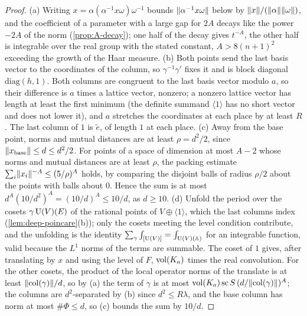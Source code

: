 \begin{proof}
(a) Writing $x=\alpha(\alpha^{-1}x\omega)\omega^{-1}$ bounds $\lVert \alpha^{-1}x\omega\rVert$ below by $\lVert x\rVert/(\lVert \alpha\rVert\lVert \omega\rVert)$, and the coefficient of a parameter with a large gap for $2A$ decays like the power $-2A$ of the norm
(\cref{prop:A-decay}); one half of the decay gives $t^{-A}$, the other half is integrable over the real group with the stated constant, $A>8(n+1)^2$ exceeding the growth of the Haar measure. (b) Both points send the
last basis vector to the coordinates of the column, so $\gamma^{-1}\gamma'$ fixes it and is block diagonal $\mathrm{diag}(h,1)$. Both columns are congruent to the last basis vector modulo $a$, so their difference is $a$ times a lattice
vector, nonzero; a nonzero lattice vector has length at least the first minimum (the definite summand $\langle1\rangle$ has no short vector and does not lower it), and $a$ stretches the coordinates at each place by at least $R$. The
last column of $1$ is $\tilde e$, of length $1$ at each place. (c) Away from the base point, norms and mutual distances are at least $\rho=d^2/2$, since $\lVert x_{\rm base}\rVert\le d\le d^2/2$. For points of a space of dimension at most $A-2$ whose norms and mutual distances
are at least $\rho$, the packing estimate $\sum_i\lVert x_i\rVert^{-A}\le(5/\rho)^A$ holds, by comparing the disjoint balls of radius $\rho/2$ about the points with balls about $0$. Hence the sum is at most
$d^A(10/d^2)^A=(10/d)^A\le10/d$, as $d\ge10$. (d) Unfold the period over the cosets $\gamma\operatorname{U}(V)(E)$ of the rational points of
$V\oplus\langle1\rangle$, which the last columns index (\cref{lem:deep-poincare}(b)); only the cosets meeting the level condition contribute, and the unfolding is the identity
$\sum_\gamma\int_{[\operatorname{U}(V)]}=\int_{\operatorname{U}(V)(\mathbb{A})}$ for an integrable function, valid because the $L^1$ norms of the terms are summable. The coset of $1$ gives, after translating by $x$ and using the level of $F$, $\operatorname{vol}(K_a)$ times the
real convolution. For the other cosets, the product of the local operator norms of the translate is at least $\lVert \mathrm{col}(\gamma)\rVert/d$, so by (a) the term of $\gamma$ is at most $\operatorname{vol}(K_a)\,\mathrm{sc}\,S\,(d/\lVert \mathrm{col}(\gamma)\rVert)^A$; the
columns are $d^2$-separated by (b) since $d^2\le R\lambda$, and the base column has norm at most $\#\Phi\le d$, so (c) bounds the sum by $10/d$.
\end{proof}

